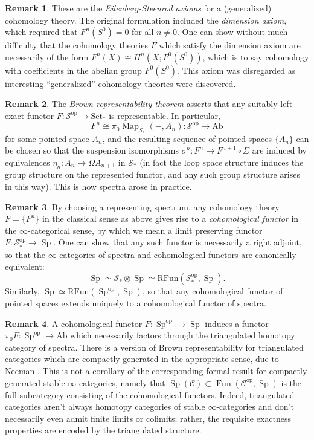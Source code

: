\documentclass{article}
\theoremstyle{definition}
\newtheorem{remark}{Remark}[subsection]
\newcommand{\C}{\mathcal{C}}
\renewcommand{\S}{\mathcal{S}}
\renewcommand{\i}{\infty}
\newcommand{\too}{\longrightarrow}
\newcommand{\op}{\mathrm{op}}
\DeclareMathOperator{\Fun}{Fun}
\newcommand{\Funr}{\mathrm{RFun}}
\DeclareMathOperator{\Map}{Map}
\DeclareMathOperator{\Sp}{Sp}
\newcommand{\Ab}{\mathrm{Ab}}
\begin{document}
\begin{remark}
These are the {\em Eilenberg-Steenrod axioms} \cite{ES52} for a (generalized) cohomology theory.
The original formulation included the {\em dimension axiom},
which required that $F^n(S^0)=0$ for all $n\neq 0$.
One can show without much difficulty that the cohomology theories $F$ which satisfy the dimension axiom are necessarily of the form $F^n(X)\cong H^n(X;F^0(S^0))$, which is to say cohomology with coefficients in the abelian group $F^0(S^0)$.
This axiom was disregarded as interesting ``generalized'' cohomology theories were discovered.
\end{remark}

\begin{remark}
The {\em Brown representability theorem}
\cite{Br62}
asserts that any suitably left exact functor $F:\S^{\op}\to\mathrm{Set}_*$ is representable.
In particular,
\[
F^n\cong\pi_0\Map_{\S_*}(-,A_n)\colon\S^{\op}\too\Ab
\]
for some pointed space $A_n$, and the resulting sequence of pointed spaces $\{A_n\}$ can be chosen so that the suspension isomorphisms
$\sigma^n:F^n\to F^{n+1}\circ\Sigma$ are induced by equivalences $\eta_n:A_n\to\Omega A_{n+1}$ in $\S_*$ (in fact the loop space structure induces the group structure on the represented functor, and any such group structure arises in this way). This is how spectra arose in practice.
\end{remark}




\begin{remark}
By choosing a representing spectrum, any cohomology theory $F=\{F^n\}$ in the classical sense as above gives rise to a {\em cohomological functor} in the $\i$-categorical sense, by which we mean a limit preserving functor $F:\S_*^{\op}\to\Sp$.
One can show that any such functor is necessarily a right adjoint, so that the $\i$-categories of spectra and cohomological functors are canonically equivalent: 
\[
\Sp\simeq\S_*\otimes\Sp\simeq\Funr(\S_*^{\op},\Sp).
\]
Similarly, $\Sp\simeq\Funr(\Sp^{\op},\Sp)$, so that any cohomological functor of pointed spaces extends uniquely to a cohomological functor of spectra.
\end{remark}
\begin{remark}
A cohomological functor $F:\Sp^{\op}\to\Sp$ induces a functor $\pi_0 F:\Sp^{\op}\to\Ab$ which necessarily factors through the triangulated homotopy category of spectra.
There is a version of Brown representability for triangulated categories which are compactly generated in the appropriate sense, due to Neeman \cite{Nee96}.
This is not a corollary of the corresponding formal result for compactly generated stable $\i$-categories, namely that $\Sp(\C)\subset\Fun(\C^{\op},\Sp)$ is the full subcategory consisting of the cohomological functors.
Indeed, triangulated categories aren't always homotopy categories of stable $\i$-categories and don't necessarily even admit finite limits or colimits; rather, the requisite exactness properties are encoded by the triangulated structure. 
\end{remark}
\end{document}
